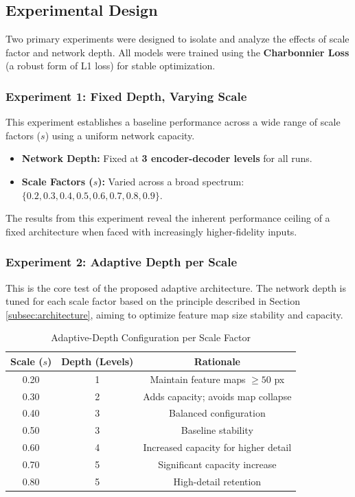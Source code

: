 \subsection{Experimental Design}
\label{subsec:exp_design}

Two primary experiments were designed to isolate and analyze the effects of scale factor and network depth. All models were trained using the \textbf{Charbonnier Loss} (a robust form of L1 loss) for stable optimization.

\subsubsection{Experiment 1: Fixed Depth, Varying Scale}
This experiment establishes a baseline performance across a wide range of scale factors ($s$) using a uniform network capacity.
\begin{itemize}
    \item \textbf{Network Depth:} Fixed at \textbf{3 encoder-decoder levels} for all runs.
    \item \textbf{Scale Factors ($s$):} Varied across a broad spectrum: $\{0.2, 0.3, 0.4, 0.5, 0.6, 0.7, 0.8, 0.9\}$.
\end{itemize}
The results from this experiment reveal the inherent performance ceiling of a fixed architecture when faced with increasingly higher-fidelity inputs.

\subsubsection{Experiment 2: Adaptive Depth per Scale}
This is the core test of the proposed adaptive architecture. The network depth is tuned for each scale factor based on the principle described in Section \ref{subsec:architecture}, aiming to optimize feature map size stability and capacity.

\begin{table}[h!]
    \centering
    \caption{Adaptive-Depth Configuration per Scale Factor}
    \label{tab:adaptive_depth}
    \begin{tabular}{|c|c|c|}
        \hline
        \textbf{Scale ($s$)} & \textbf{Depth (Levels)} & \textbf{Rationale} \\
        \hline
        0.20 & 1 & Maintain feature maps $\ge 50$ px \\
        0.30 & 2 & Adds capacity; avoids map collapse \\
        0.40 & 3 & Balanced configuration \\
        0.50 & 3 & Baseline stability \\
        0.60 & 4 & Increased capacity for higher detail \\
        0.70 & 5 & Significant capacity increase \\
        0.80 & 5 & High-detail retention \\
        \hline
    \end{tabular}
\end{table}

